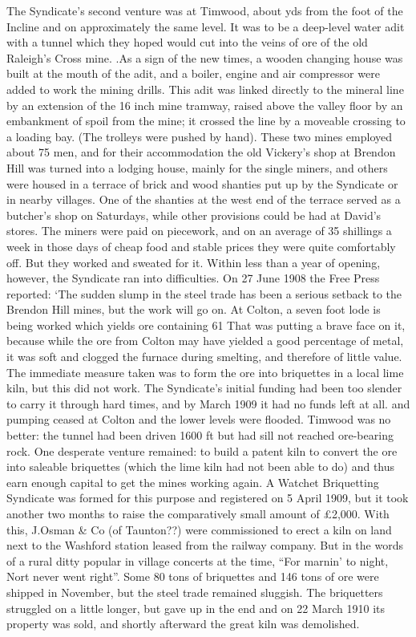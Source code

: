 \documentclass[10pt,a4paper]{article}
\begin{document}
   The Syndicate’s second venture was at Timwood, about       yds from the foot of the Incline and on approximately the same level. It was to be a deep-level water adit with a tunnel which they hoped would cut into the veins of ore of the old Raleigh’s Cross mine. .As a sign of the new times, a wooden changing house was built at the mouth of the adit, and a boiler, engine and air compressor were added to work the mining drills. This adit was linked directly to the mineral line by an extension of the 16 inch mine tramway, raised above the valley floor by an embankment of spoil from the mine; it crossed the line by a moveable crossing to a loading bay. (The trolleys were pushed by hand).
    These two mines employed about 75 men, and for their accommodation the old Vickery’s shop at Brendon Hill was turned into a lodging house, mainly for the single miners, and others were housed in a terrace of brick and wood shanties put up by the Syndicate or in nearby villages. One of the shanties at the west end of the terrace served as a butcher’s shop on Saturdays, while other provisions could be had at David’s stores. The miners were paid on piecework, and on an average of 35 shillings a week in those days of cheap food and stable prices they were quite comfortably off. But they worked and sweated for it.
  Within less than a year of opening, however, the Syndicate ran into difficulties. On 27 June 1908 the Free Press reported:
    ‘The sudden slump in the steel trade has been a serious setback to the Brendon Hill mines, but the work will go on.  At Colton, a seven foot lode is being worked which yields ore containing 61%
   That was putting a brave face on it, because while the ore from Colton may have yielded a good percentage of metal, it was soft and clogged the furnace during smelting, and therefore of little value. The immediate measure taken was to form the ore into briquettes in a local lime kiln, but this did not work.  The Syndicate’s initial funding had been too slender to carry it through hard times, and by March 1909 it had no funds left at all. and pumping ceased at Colton and the lower levels were flooded. Timwood was no better: the tunnel had been driven 1600 ft but had sill not reached ore-bearing rock.
   One desperate venture remained: to build a patent kiln to convert the ore into saleable briquettes (which the lime kiln had not been able to do) and thus earn enough capital to get the mines working again. A Watchet Briquetting Syndicate was formed for this purpose and registered on 5 April 1909, but it took another two months to raise the comparatively small amount of £2,000. With this,  J.Osman \& Co (of Taunton??) were commissioned to erect a kiln on land next to the Washford station leased from the railway company. But in the words of a rural ditty popular in village concerts at the time, “For marnin’ to night, Nort never went right”. Some 80 tons of briquettes and 146 tons of ore were shipped in November, but the steel trade remained sluggish. The briquetters struggled on a little longer, but gave up in the end and on 22 March 1910 its property was sold, and shortly afterward the great kiln was demolished. 
\end{document}
